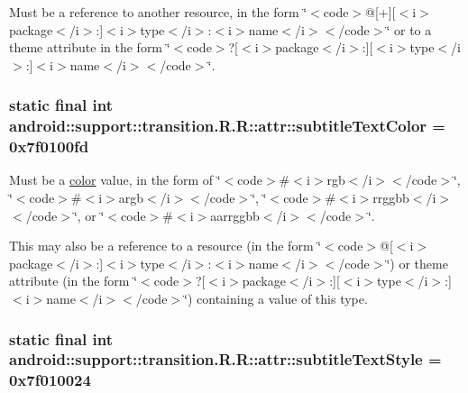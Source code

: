 Must be a reference to another resource, in the form \char`\"{}$<$code$>$@\mbox{[}+\mbox{]}\mbox{[}$<$i$>$package$<$/i$>$:\mbox{]}$<$i$>$type$<$/i$>$:$<$i$>$name$<$/i$>$$<$/code$>$\char`\"{} or to a theme attribute in the form \char`\"{}$<$code$>$?\mbox{[}$<$i$>$package$<$/i$>$:\mbox{]}\mbox{[}$<$i$>$type$<$/i$>$:\mbox{]}$<$i$>$name$<$/i$>$$<$/code$>$\char`\"{}. \hypertarget{classandroid_1_1support_1_1transition_1_1_r_1_1attr_3ca21ad1a8d67f8c682488e9acedc6a7}{
\subsubsection[{subtitleTextColor}]{\setlength{\rightskip}{0pt plus 5cm}static final int android::support::transition.R.R::attr::subtitleTextColor = 0x7f0100fd}}
\label{classandroid_1_1support_1_1transition_1_1_r_1_1attr_3ca21ad1a8d67f8c682488e9acedc6a7}


Must be a \hyperlink{classandroid_1_1support_1_1transition_1_1_r_1_1color}{color} value, in the form of \char`\"{}$<$code$>$\#$<$i$>$rgb$<$/i$>$$<$/code$>$\char`\"{}, \char`\"{}$<$code$>$\#$<$i$>$argb$<$/i$>$$<$/code$>$\char`\"{}, \char`\"{}$<$code$>$\#$<$i$>$rrggbb$<$/i$>$$<$/code$>$\char`\"{}, or \char`\"{}$<$code$>$\#$<$i$>$aarrggbb$<$/i$>$$<$/code$>$\char`\"{}. 

This may also be a reference to a resource (in the form \char`\"{}$<$code$>$@\mbox{[}$<$i$>$package$<$/i$>$:\mbox{]}$<$i$>$type$<$/i$>$:$<$i$>$name$<$/i$>$$<$/code$>$\char`\"{}) or theme attribute (in the form \char`\"{}$<$code$>$?\mbox{[}$<$i$>$package$<$/i$>$:\mbox{]}\mbox{[}$<$i$>$type$<$/i$>$:\mbox{]}$<$i$>$name$<$/i$>$$<$/code$>$\char`\"{}) containing a value of this type. \hypertarget{classandroid_1_1support_1_1transition_1_1_r_1_1attr_1f3c772b2becf4e56ec7ad338133362d}{
\subsubsection[{subtitleTextStyle}]{\setlength{\rightskip}{0pt plus 5cm}static final int android::support::transition.R.R::attr::subtitleTextStyle = 0x7f010024}}
\label{classandroid_1_1support_1_1transition_1_1_r_1_1attr_1f3c772b2becf4e56ec7ad338133362d}


